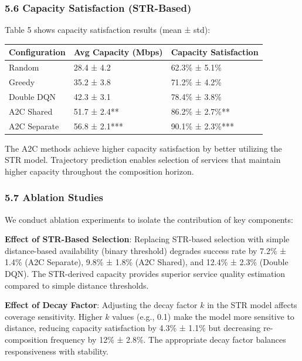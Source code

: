\documentclass[
  10pt,
  twocolumn,
]{article}
\begin{document}
\hypertarget{capacity-satisfaction-str-based}{%
	\subsubsection{5.6 Capacity Satisfaction
		(STR-Based)}\label{capacity-satisfaction-str-based}}

Table 5 shows capacity satisfaction results (mean ± std):

\begin{longtable}[]{@{}lll@{}}
	\toprule\noalign{}
	Configuration & Avg Capacity (Mbps) & Capacity Satisfaction \\
	\midrule\noalign{}
	\endhead
	\bottomrule\noalign{}
	\endlastfoot
	Random        & 28.4 ± 4.2          & 62.3\% ± 5.1\%        \\
	Greedy        & 35.2 ± 3.8          & 71.2\% ± 4.2\%        \\
	Double DQN    & 42.3 ± 3.1          & 78.4\% ± 3.8\%        \\
	A2C Shared    & 51.7 ± 2.4**        & 86.2\% ± 2.7\%**      \\
	A2C Separate  & 56.8 ± 2.1***       & 90.1\% ± 2.3\%***     \\
\end{longtable}

The A2C methods achieve higher capacity satisfaction by better utilizing
the STR model. Trajectory prediction enables selection of services that
maintain higher capacity throughout the composition horizon.

\hypertarget{ablation-studies}{%
	\subsubsection{5.7 Ablation Studies}\label{ablation-studies}}

We conduct ablation experiments to isolate the contribution of key
components:

\textbf{Effect of STR-Based Selection}: Replacing STR-based selection
with simple distance-based availability (binary threshold) degrades
success rate by 7.2\% ± 1.4\% (A2C Separate), 9.8\% ± 1.8\% (A2C
Shared), and 12.4\% ± 2.3\% (Double DQN). The STR-derived capacity
provides superior service quality estimation compared to simple distance
thresholds.

\textbf{Effect of Decay Factor}: Adjusting the decay factor \(k\) in the
STR model affects coverage sensitivity. Higher \(k\) values (e.g., 0.1)
make the model more sensitive to distance, reducing capacity
satisfaction by 4.3\% ± 1.1\% but decreasing re-composition frequency by
12\% ± 2.8\%. The appropriate decay factor balances responsiveness with
stability.
\end{document}
